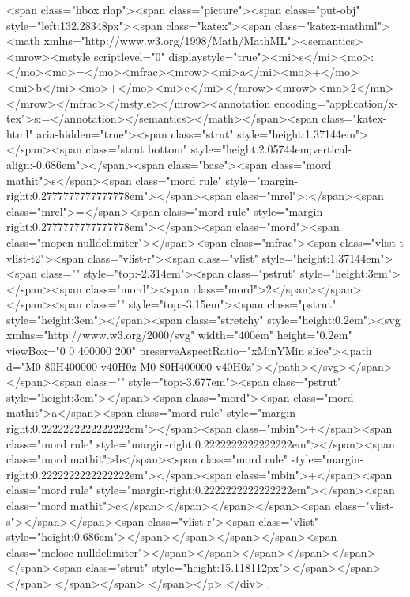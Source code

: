 <span class="hbox rlap"><span class="picture"><span class="put-obj" style="left:132.28348px"><span class="katex"><span class="katex-mathml"><math xmlns="http://www.w3.org/1998/Math/MathML"><semantics><mrow><mstyle scriptlevel="0" displaystyle="true"><mi>s</mi><mo>:</mo><mo>=</mo><mfrac><mrow><mi>a</mi><mo>+</mo><mi>b</mi><mo>+</mo><mi>c</mi></mrow><mrow><mn>2</mn></mrow></mfrac></mstyle></mrow><annotation encoding="application/x-tex">\displaystyle s:=</annotation></semantics></math></span><span class="katex-html" aria-hidden="true"><span class="strut" style="height:1.37144em"></span><span class="strut bottom" style="height:2.05744em;vertical-align:-0.686em"></span><span class="base"><span class="mord mathit">s</span><span class="mord rule" style="margin-right:0.2777777777777778em"></span><span class="mrel">:</span><span class="mrel">=</span><span class="mord rule" style="margin-right:0.2777777777777778em"></span><span class="mord"><span class="mopen nulldelimiter"></span><span class="mfrac"><span class="vlist-t vlist-t2"><span class="vlist-r"><span class="vlist" style="height:1.37144em"><span class="" style="top:-2.314em"><span class="pstrut" style="height:3em"></span><span class="mord"><span class="mord">2</span></span></span><span class="" style="top:-3.15em"><span class="pstrut" style="height:3em"></span><span class="stretchy" style="height:0.2em"><svg xmlns="http://www.w3.org/2000/svg" width="400em" height="0.2em" viewBox="0 0 400000 200" preserveAspectRatio="xMinYMin slice"><path d="M0 80H400000 v40H0z M0 80H400000 v40H0z"></path></svg></span></span><span class="" style="top:-3.677em"><span class="pstrut" style="height:3em"></span><span class="mord"><span class="mord mathit">a</span><span class="mord rule" style="margin-right:0.2222222222222222em"></span><span class="mbin">+</span><span class="mord rule" style="margin-right:0.2222222222222222em"></span><span class="mord mathit">b</span><span class="mord rule" style="margin-right:0.2222222222222222em"></span><span class="mbin">+</span><span class="mord rule" style="margin-right:0.2222222222222222em"></span><span class="mord mathit">c</span></span></span></span><span class="vlist-s">​</span></span><span class="vlist-r"><span class="vlist" style="height:0.686em"></span></span></span></span><span class="mclose nulldelimiter"></span></span></span></span></span></span><span class="strut" style="height:15.118112px"></span></span></span>
</span></span>​ </span></p>
</div>
.